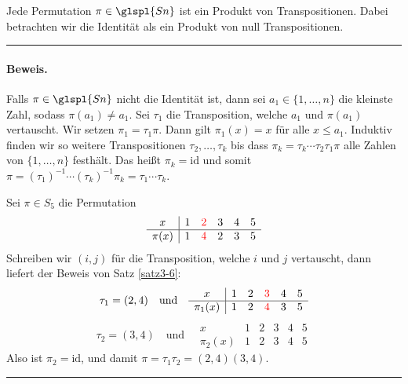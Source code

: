 \documentclass[9pt]{article}
\begin{document}
\begin{satz} \label{satz3-6}
Jede Permutation \( \pi \in \glspl{Sn} \) ist ein Produkt von Transpositionen. Dabei betrachten wir die Identität als ein Produkt von null Transpositionen.
 \end{satz} \noindent \rule{8cm}{0.4pt}

\paragraph{Beweis.} Falls \( \pi \in \glspl{Sn} \) nicht die Identität ist, dann sei \( a_1 \in \{1, \ldots, n\} \) die kleinste Zahl, sodass \( \pi(a_1) \neq a_1 \). Sei \( \tau_1 \) die Transposition, welche \( a_1 \) und \( \pi(a_1) \) vertauscht. Wir setzen \( \pi_1 = \tau_1 \pi \). Dann gilt \( \pi_1(x) = x \) für alle \( x \leq a_1 \). Induktiv finden wir so weitere Transpositionen \( \tau_2, \ldots, \tau_k \) bis dass \( \pi_k = \tau_k \cdots \tau_2 \tau_1 \pi \) alle Zahlen von \( \{1, \ldots, n\} \) festhält. Das heißt \( \pi_k = \text{id} \) und somit \( \pi = (\tau_1)^{-1} \cdots (\tau_k)^{-1} \pi_k = \tau_1 \cdots \tau_k \).

\begin{bsp}
Sei \( \pi \in S_5 \) die Permutation
\[
\begin{array}{c|ccccc}
x & 1 & \textcolor{red}{2} & 3 & 4 & 5 \\
\hline
\pi(x) & 1 & \textcolor{red}{4} & 2 & 3 & 5
\end{array}
\]
Schreiben wir \( (i, j) \) für die Transposition, welche \( i \) und \( j \) vertauscht, dann liefert der Beweis von Satz \ref{satz3-6}: \\
\[
\tau_1 = (2, 4) \quad \text{und} \quad 
\begin{array}{c|ccccc}
x & 1 & 2 & \textcolor{red}{3} & 4 & 5 \\
\hline
\pi_1(x) & 1 & 2 & \textcolor{red}{4} & 3 & 5
\end{array}
\]
\[
\tau_2 = (3, 4) \quad \text{und} \quad 
\begin{array}{c|ccccc}
x & 1 & 2 & 3 & 4 & 5 \\
\hline
\pi_2(x) & 1 & 2 & 3 & 4 & 5
\end{array}
\]
Also ist \( \pi_2 = \text{id} \), und damit \( \pi = \tau_1 \tau_2 = (2, 4)(3, 4) \).
\end{bsp} \noindent \rule{8cm}{0.4pt}
\end{document}
